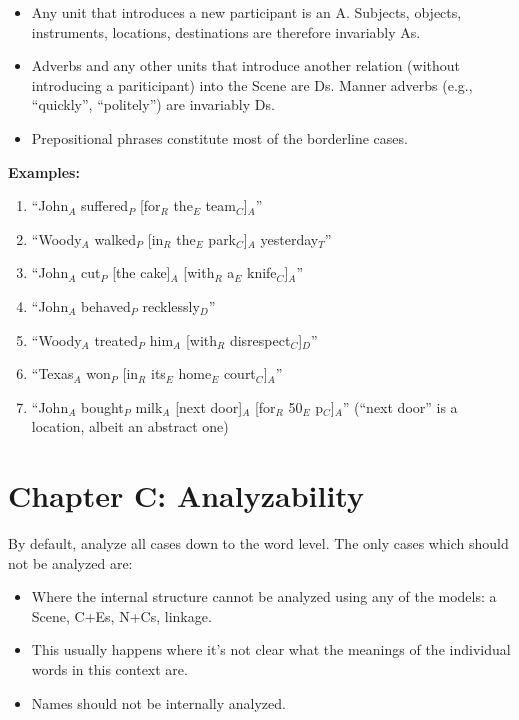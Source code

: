 \documentclass[11pt]{article}
\begin{document}
\begin{itemize}
\item
Any unit that introduces a new participant is an A. Subjects, objects, instruments, locations, destinations are therefore invariably As.
\item
Adverbs and any other units that introduce another relation (without introducing a pariticipant) into the Scene are Ds. Manner adverbs (e.g., ``quickly'', ``politely'') are invariably Ds.
\item
Prepositional phrases constitute most of the borderline cases.
\end{itemize}


{\bf Examples:}

\begin{enumerate}
\item
``John$_A$ suffered$_P$ [for$_R$ the$_E$ team$_C$]$_A$''
\item
``Woody$_A$ walked$_P$ [in$_R$ the$_E$ park$_C$]$_A$ yesterday$_T$''
\item
``John$_A$ cut$_P$ [the cake]$_A$ [with$_R$ a$_E$ knife$_C$]$_A$''
\item
``John$_A$ behaved$_P$ recklessly$_D$''
\item
``Woody$_A$ treated$_P$ him$_A$ [with$_R$ disrespect$_C$]$_D$''
\item
``Texas$_A$ won$_P$ [in$_R$ its$_E$ home$_E$ court$_C$]$_A$''
\item
``John$_A$ bought$_P$ milk$_A$ [next door]$_A$ [for$_R$ 50$_E$ p$_C$]$_A$'' (``next door'' is a location, albeit an abstract one)
\end{enumerate}


\section{\large Chapter C: Analyzability}

By default, analyze all cases down to the word level.
The only cases which should not be analyzed are:

\begin{itemize}
\item
Where the internal structure cannot be analyzed using any of the models: a Scene, C+Es, N+Cs, linkage.
\item
This usually happens where it's not clear what the meanings of the individual words in this context are.
\item
Names should not be internally analyzed.
\end{itemize}
\end{document}
